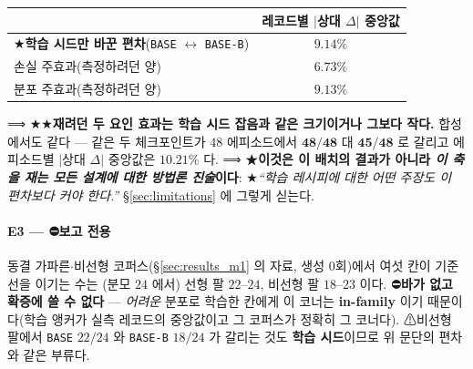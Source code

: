 \documentclass[11pt]{report}
\numberwithin{equation}{chapter}
\numberwithin{figure}{chapter}
\numberwithin{table}{chapter}
\begin{document}
\begin{center}
\small
\begin{tabular}{lc}
\toprule
 & 레코드별 $|$상대 $\Delta|$ 중앙값 \\
\midrule
★\textbf{학습 시드만 바꾼 편차}(\texttt{BASE} $\leftrightarrow$ \texttt{BASE-B}) & $\mathbf{9.14\%}$ \\
손실 주효과(측정하려던 양) & $6.73\%$ \\
분포 주효과(측정하려던 양) & $9.13\%$ \\
\bottomrule
\end{tabular}
\end{center}
\noindent
⟹ ★★\textbf{재려던 두 요인 효과는 학습 시드 잡음과 같은 크기이거나 그보다 작다.} 합성에서도
같다 --- 같은 두 체크포인트가 $48$ 에피소드에서 $\mathbf{48/48}$ 대 $\mathbf{45/48}$ 로 갈리고
에피소드별 $|$상대 $\Delta|$ 중앙값은 $\mathbf{10.21\%}$ 다.
⟹ ★\textbf{이것은 이 배치의 결과가 아니라 \emph{이 축을 재는 모든 설계에 대한 방법론
진술}이다}: ★\emph{``학습 레시피에 대한 어떤 주장도 이 편차보다 커야 한다.''}
\S\ref{sec:limitations} 에 그렇게 싣는다.

\paragraph{E3 --- ⛔보고 전용}
동결 가파른$\cdot$비선형 코퍼스(\S\ref{sec:results_m1} 의 자료, 생성 $0$회)에서 여섯 칸이
기준선을 이기는 수는 (분모 $24$ 에서) 선형 팔 $22$--$24$, 비선형 팔 $18$--$23$ 이다.
⛔\textbf{바가 없고
확증에 쓸 수 없다} --- \emph{어려운} 분포로 학습한 칸에게 이 코너는 \textbf{in-family} 이기
때문이다(학습 앵커가 실측 레코드의 중앙값이고 그 코퍼스가 정확히 그 코너다). ⚠비선형 팔에서
\texttt{BASE} $22/24$ 와 \texttt{BASE-B} $18/24$ 가 갈리는 것도 \textbf{학습 시드}이므로 위
문단의 편차와 같은 부류다.
\end{document}
